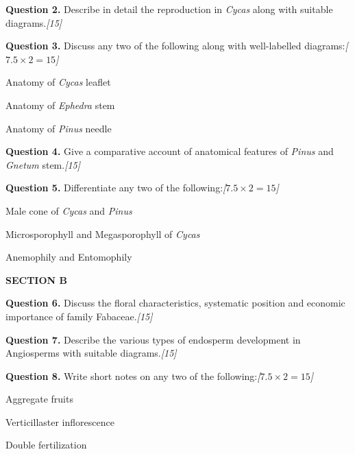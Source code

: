\documentclass[11pt,a4paper]{article}
\newcommand{\pts}[1]{\hfill   \textit{[#1]}}
\begin{document}
\noindent   \textbf{Question 2.} Describe in detail the reproduction in   \textit{Cycas} along with suitable diagrams.\pts{15}

\medskip


\noindent   \textbf{Question 3.} Discuss any two of the following along with well-labelled diagrams:\pts{$7.5  \times 2 = 15$}

\begin{parts}
  \item Anatomy of   \textit{Cycas} leaflet
  \item Anatomy of   \textit{Ephedra} stem
  \item Anatomy of   \textit{Pinus} needle
\end{parts}

\medskip


\noindent   \textbf{Question 4.} Give a comparative account of anatomical features of   \textit{Pinus} and   \textit{Gnetum} stem.\pts{15}

\medskip


\noindent   \textbf{Question 5.} Differentiate any two of the following:\pts{$7.5  \times 2 = 15$}

\begin{parts}
  \item Male cone of   \textit{Cycas} and   \textit{Pinus}
  \item Microsporophyll and Megasporophyll of   \textit{Cycas}
  \item Anemophily and Entomophily
\end{parts}

\bigskip

\begin{center}
   \textbf{SECTION B}
\end{center}
\medskip

\medskip


\noindent   \textbf{Question 6.} Discuss the floral characteristics, systematic position and economic importance of family Fabaceae.\pts{15}

\medskip


\noindent   \textbf{Question 7.} Describe the various types of endosperm development in Angiosperms with suitable diagrams.\pts{15}

\medskip


\noindent   \textbf{Question 8.} Write short notes on any two of the following:\pts{$7.5  \times 2 = 15$}

\begin{parts}
  \item Aggregate fruits
  \item Verticillaster inflorescence
  \item Double fertilization
\end{parts}
\end{document}
